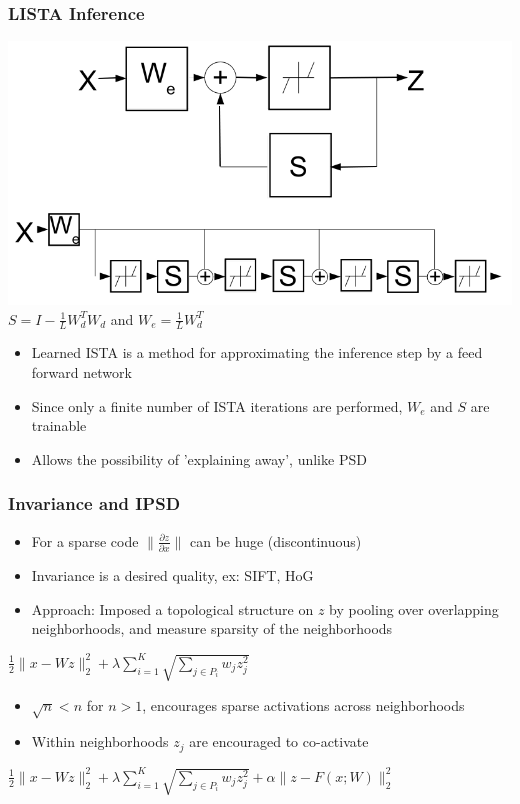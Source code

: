 \documentclass{beamer}
\begin{document}
\begin{frame}
\frametitle{LISTA Inference}  
\begin{center} 
\includegraphics[scale = 0.25]{LISTA.png} \\
$S = I - \frac{1}{L} W_d ^T W_d$ and $W_e = \frac{1}{L} W_d ^T$
\end{center} 
\begin{itemize}
\item{Learned ISTA is a method for approximating the inference step by a feed forward network} 
\item{Since only a finite number of ISTA iterations are performed, $W_e$ and $S$ are trainable} 
\item{Allows the possibility of 'explaining away', unlike PSD}
\end{itemize} 
\end{frame} 

\begin{frame}
\frametitle{Invariance and IPSD}
\begin{itemize}
\item{For a sparse code $\| \frac{\partial z}{\partial x} \|$ can be huge (discontinuous)}  
\item{Invariance is a desired quality, ex: SIFT, HoG} 
\item{Approach: Imposed a topological structure on $z$ by pooling over overlapping neighborhoods, and measure sparsity of the neighborhoods}  
\end{itemize} 
\begin{center}
$\frac{1}{2} \|x - Wz \|_2 ^ 2 + \lambda \sum_{i=1} ^ K \sqrt{\sum_{j \in P_i} w_jz_j ^2}$ 
\begin{itemize} 
\item{$\sqrt{n} < n$ for $n>1$, encourages sparse activations across neighborhoods}
\item{Within neighborhoods $z_j$ are encouraged to co-activate}
\end{itemize}
$\frac{1}{2} \|x - Wz \|_2 ^ 2 + \lambda \sum_{i=1} ^ K \sqrt{\sum_{j \in P_i} w_jz_j ^2} + \alpha \|z - F(x;W) \|_2 ^2$ 
\end{center} 
\end{frame} 
\end{document}
